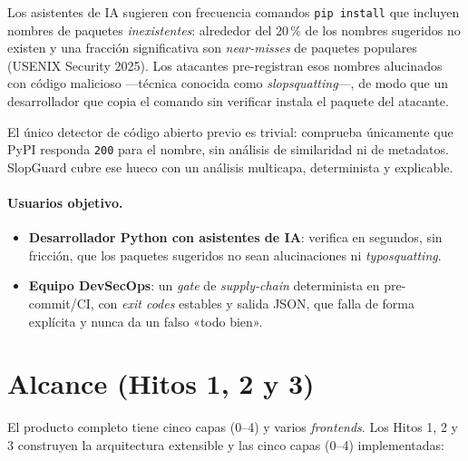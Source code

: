\documentclass[11pt,a4paper]{article}
\begin{document}
Los asistentes de IA sugieren con frecuencia comandos \texttt{pip install} que
incluyen nombres de paquetes \emph{inexistentes}: alrededor del 20\,\% de los nombres
sugeridos no existen y una fracción significativa son \emph{near-misses} de paquetes
populares (USENIX Security 2025). Los atacantes pre-registran esos nombres alucinados
con código malicioso ---técnica conocida como \emph{slopsquatting}---, de modo que un
desarrollador que copia el comando sin verificar instala el paquete del atacante.

El único detector de código abierto previo es trivial: comprueba únicamente que PyPI
responda \texttt{200} para el nombre, sin análisis de similaridad ni de metadatos.
SlopGuard cubre ese hueco con un análisis multicapa, determinista y explicable.

\paragraph{Usuarios objetivo.}
\begin{itemize}[nosep]
  \item \textbf{Desarrollador Python con asistentes de IA}: verifica en segundos, sin
  fricción, que los paquetes sugeridos no sean alucinaciones ni \emph{typosquatting}.
  \item \textbf{Equipo DevSecOps}: un \emph{gate} de \emph{supply-chain} determinista en
  pre-commit/CI, con \emph{exit codes} estables y salida JSON, que falla de forma
  explícita y nunca da un falso «todo bien».
\end{itemize}

\section{Alcance (Hitos 1, 2 y 3)}

El producto completo tiene cinco capas (0--4) y varios \emph{frontends}. Los Hitos 1, 2 y 3
construyen la arquitectura extensible y las cinco capas (0--4) implementadas:
\end{document}
